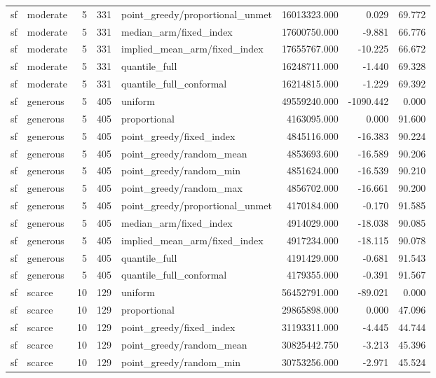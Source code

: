 \begin{tabular}{llrrlrrr}
sf & moderate & 5 & 331 & point\_greedy/proportional\_unmet & 16013323.000 & 0.029 & 69.772 \\
sf & moderate & 5 & 331 & median\_arm/fixed\_index & 17600750.000 & -9.881 & 66.776 \\
sf & moderate & 5 & 331 & implied\_mean\_arm/fixed\_index & 17655767.000 & -10.225 & 66.672 \\
sf & moderate & 5 & 331 & quantile\_full & 16248711.000 & -1.440 & 69.328 \\
sf & moderate & 5 & 331 & quantile\_full\_conformal & 16214815.000 & -1.229 & 69.392 \\
sf & generous & 5 & 405 & uniform & 49559240.000 & -1090.442 & 0.000 \\
sf & generous & 5 & 405 & proportional & 4163095.000 & 0.000 & 91.600 \\
sf & generous & 5 & 405 & point\_greedy/fixed\_index & 4845116.000 & -16.383 & 90.224 \\
sf & generous & 5 & 405 & point\_greedy/random\_mean & 4853693.600 & -16.589 & 90.206 \\
sf & generous & 5 & 405 & point\_greedy/random\_min & 4851624.000 & -16.539 & 90.210 \\
sf & generous & 5 & 405 & point\_greedy/random\_max & 4856702.000 & -16.661 & 90.200 \\
sf & generous & 5 & 405 & point\_greedy/proportional\_unmet & 4170184.000 & -0.170 & 91.585 \\
sf & generous & 5 & 405 & median\_arm/fixed\_index & 4914029.000 & -18.038 & 90.085 \\
sf & generous & 5 & 405 & implied\_mean\_arm/fixed\_index & 4917234.000 & -18.115 & 90.078 \\
sf & generous & 5 & 405 & quantile\_full & 4191429.000 & -0.681 & 91.543 \\
sf & generous & 5 & 405 & quantile\_full\_conformal & 4179355.000 & -0.391 & 91.567 \\
sf & scarce & 10 & 129 & uniform & 56452791.000 & -89.021 & 0.000 \\
sf & scarce & 10 & 129 & proportional & 29865898.000 & 0.000 & 47.096 \\
sf & scarce & 10 & 129 & point\_greedy/fixed\_index & 31193311.000 & -4.445 & 44.744 \\
sf & scarce & 10 & 129 & point\_greedy/random\_mean & 30825442.750 & -3.213 & 45.396 \\
sf & scarce & 10 & 129 & point\_greedy/random\_min & 30753256.000 & -2.971 & 45.524 \\

\end{tabular}
